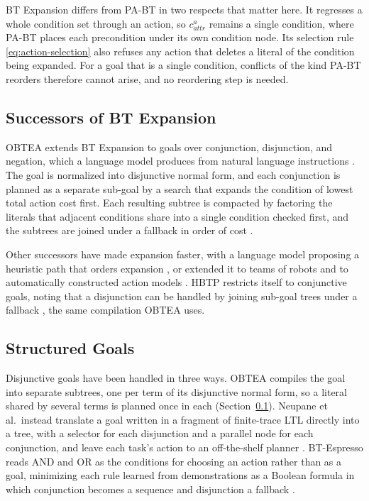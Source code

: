     BT Expansion differs from PA-BT in two respects that matter here.
    It regresses a whole condition set through an action, so $c^a_{attr}$ remains a single condition, where PA-BT places each precondition under its own condition node.
    Its selection rule \eqref{eq:action-selection} also refuses any action that deletes a literal of the condition being expanded.
    For a goal that is a single condition, conflicts of the kind PA-BT reorders therefore cannot arise, and no reordering step is needed.

    \subsection{Successors of BT Expansion}
    \label{chen2024_section}
    OBTEA extends BT Expansion to goals over conjunction, disjunction, and negation, which a language model produces from natural language instructions \cite{chen2024}.
    The goal is normalized into disjunctive normal form, and each conjunction is planned as a separate sub-goal by a search that expands the condition of lowest total action cost first.
    Each resulting subtree is compacted by factoring the literals that adjacent conditions share into a single condition checked first, and the subtrees are joined under a fallback in order of cost \cite{chen2024}.

    Other successors have made expansion faster, with a language model proposing a heuristic path that orders expansion \cite{cai2024hbtp}, or extended it to teams of robots \cite{cai2025mrbtp} and to automatically constructed action models \cite{cai2026cabto}.
    HBTP restricts itself to conjunctive goals, noting that a disjunction can be handled by joining sub-goal trees under a fallback \cite{cai2024hbtp}, the same compilation OBTEA uses.

    \subsection{Structured Goals}
    \label{subsec:rw_structured}
    Disjunctive goals have been handled in three ways.
    OBTEA compiles the goal into separate subtrees, one per term of its disjunctive normal form, so a literal shared by several terms is planned once in each (Section~\ref{chen2024_section}).
    Neupane et al.\ instead translate a goal written in a fragment of finite-trace LTL directly into a tree, with a selector for each disjunction and a parallel node for each conjunction, and leave each task's action to an off-the-shelf planner \cite{neupane2023}.
    BT-Espresso reads AND and OR as the conditions for choosing an action rather than as a goal, minimizing each rule learned from demonstrations as a Boolean formula in which conjunction becomes a sequence and disjunction a fallback \cite{french2019}.

